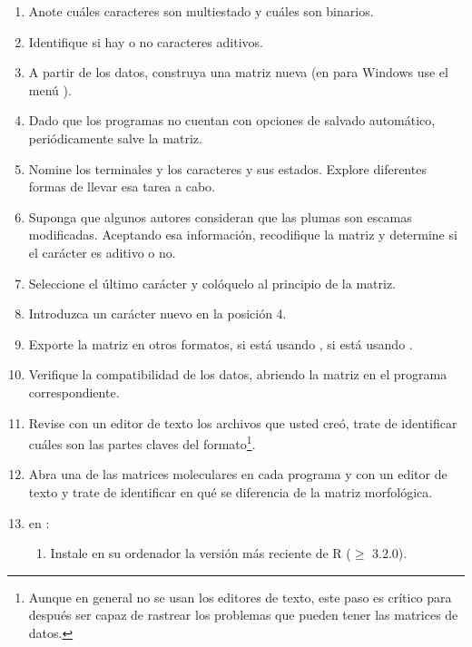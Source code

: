 \begin{enumerate}
	\item Anote cu\'ales caracteres son multiestado y cu\'ales son binarios.

	\item Identifique si hay o no caracteres aditivos.

	\item A partir de los datos, construya una matriz nueva (en  para Windows use el men\'u ). 

	\item Dado que los programas no cuentan con opciones de salvado autom\'atico, peri\'odicamente salve la matriz.

	\item Nomine los terminales y los caracteres y sus estados. Explore diferentes formas de llevar esa tarea a cabo. 

	\item Suponga que algunos autores consideran que las plumas son escamas modificadas. Aceptando esa informaci\'on, recodifique la matriz y determine si el car\'acter es aditivo o no.

	\item Seleccione el \'ultimo car\'acter y col\'oquelo al principio de la matriz. 

	\item Introduzca un car\'acter nuevo en la posici\'on 4.

	\item Exporte la matriz en otros formatos,  si est\'a usando ,  si est\'a usando .

	\item Verifique la compatibilidad de los datos, abriendo la matriz en el programa correspondiente.

	\item Revise con un editor de texto los archivos que usted cre\'o, trate de identificar cu\'ales son las partes claves del formato\footnote{Aunque en general no se usan los editores de texto, este paso es cr\'itico para despu\'es ser capaz de rastrear los problemas que pueden tener las matrices de datos.}.

	\item Abra una de las matrices moleculares en cada programa y con un editor de texto y trate de identificar en qu\'e se diferencia de la matriz morfol\'ogica.

	\item en :
	\begin{enumerate}
		\item Instale en su ordenador la versi\'on m\'as reciente de R ($\ge$ 3.2.0). 


\end{enumerate}
\end{enumerate}

